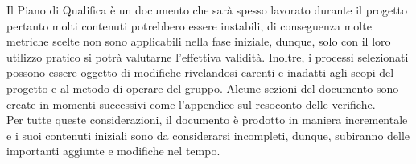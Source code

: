 Il Piano di Qualifica è un documento che sarà spesso 
lavorato durante il progetto pertanto molti contenuti 
potrebbero essere instabili, di conseguenza molte metriche
scelte non sono applicabili nella fase iniziale, dunque, solo con il loro utilizzo pratico si potrà valutarne 
l’effettiva validità. 
Inoltre, i processi selezionati possono essere oggetto di modifiche rivelandosi carenti e inadatti agli scopi del progetto
 e al metodo di operare del gruppo. 
Alcune sezioni del documento sono create in momenti successivi come l’appendice sul resoconto delle verifiche.\\
Per tutte queste considerazioni, il documento è prodotto in maniera incrementale e i suoi contenuti iniziali sono 
da considerarsi incompleti, dunque, subiranno delle importanti aggiunte e modifiche nel tempo.
